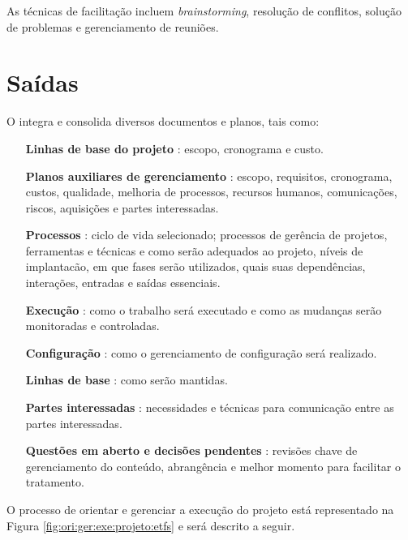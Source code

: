 As técnicas de facilitação incluem \textit{brainstorming}, resolução de conflitos, solução de problemas e gerenciamento de reuniões.

\section{Saídas}

O \planproj integra e consolida diversos documentos e planos, tais como:

\begin{itemize}

\item[\textbf{Linhas de base do projeto}] : escopo, cronograma e custo.

\item[\textbf{Planos auxiliares de gerenciamento}] : escopo, requisitos, cronograma, custos, qualidade, melhoria de processos, recursos humanos, comunicações, riscos, aquisições e partes interessadas.

\item[\textbf{Processos}] : ciclo de vida selecionado; processos de gerência de projetos, ferramentas e técnicas e como serão adequados ao projeto, níveis de implantacão, em que fases serão utilizados, quais suas dependências, interações, entradas e saídas essenciais.

\item[\textbf{Execução}] : como o trabalho será executado e como as mudanças serão monitoradas e controladas. 

\item[\textbf{Configuração}] : como o gerenciamento de configuração será realizado.

\item[\textbf{Linhas de base}] : como serão mantidas.

\item[\textbf{Partes interessadas}] : necessidades e técnicas para comunicação entre as partes interessadas.

\item[\textbf{Questões em aberto e decisões pendentes}] : revisões chave de gerenciamento do conteúdo, abrangência e melhor momento para facilitar o tratamento.
\end{itemize}


O processo de orientar e gerenciar a execução do projeto está representado na Figura \ref{fig:ori:ger:exe:projeto:etfs} e será descrito a seguir.

